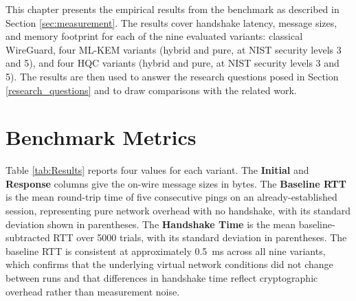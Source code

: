 
This chapter presents the empirical results from the benchmark as described in Section \ref{sec:measurement}. The results cover handshake latency, message sizes, and memory footprint for each of the nine evaluated variants: classical WireGuard, four ML-KEM variants (hybrid and pure, at NIST security levels 3 and 5), and four HQC variants (hybrid and pure, at NIST security levels 3 and 5). The results are then used to answer the research questions posed in Section \ref{research_questions} and to draw comparisons with the related work.

\section{Benchmark Metrics}

Table \ref{tab:Results} reports four values for each variant. The \textbf{Initial} and \textbf{Response} columns give the on-wire message sizes in bytes. The \textbf{Baseline RTT} is the mean round-trip time of five consecutive pings on an already-established session, representing pure network overhead with no handshake, with its standard deviation shown in parentheses. The \textbf{Handshake Time} is the mean baseline-subtracted RTT over 5000 trials, with its standard deviation in parentheses. The baseline RTT is consistent at approximately \qty{0.5}{ms} across all nine variants, which confirms that the underlying virtual network conditions did not change between runs and that differences in handshake time reflect cryptographic overhead rather than measurement noise.


